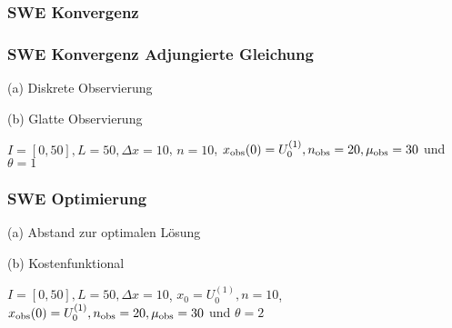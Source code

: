 \begin{frame}[<+->]
\frametitle{SWE Konvergenz}
\centering
\scalebox{0.9}{}
\end{frame}

% 
% 

\begin{frame}[<+->]
\frametitle{SWE Konvergenz Adjungierte Gleichung}
\begin{minipage}[b]{0.49\linewidth}
\centering

(a) Diskrete Observierung
\end{minipage}
\begin{minipage}[b]{0.49\linewidth}
\centering

(b) Glatte Observierung
\end{minipage}
\centering
$I=[0,50],L=50,\Delta x=10$, $n=10$, $x_\text{obs}(0) = U_0^{(1)}, n_{\text{obs}}=20,\mu_{\text{obs}}=30$ und $\theta=1$
\end{frame}

\begin{frame}[<+->]
\frametitle{SWE Optimierung}
\centering
\begin{minipage}[b]{0.49\linewidth}
 \centering

(a) Abstand zur optimalen Lösung
\end{minipage}
\begin{minipage}[b]{0.49\linewidth}
 \centering

(b) Kostenfunktional
\end{minipage}
$I=[0,50],L=50,\Delta x=10$, $x_0=U_0^{(1)},n=10$, $x_\text{obs}(0) = U_0^{(1)}, n_{\text{obs}}=20,\mu_{\text{obs}}=30$ und $\theta=2$

\end{frame}
